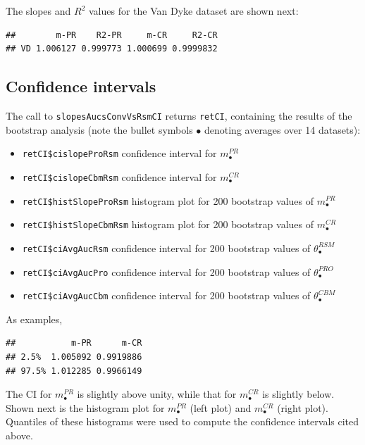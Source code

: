 \documentclass[
]{book}
\providecommand{\tightlist}{%
  \setlength{\itemsep}{0pt}\setlength{\parskip}{0pt}}
\begin{document}
The slopes and \(R^2\) values for the Van Dyke dataset are shown next:

\begin{verbatim}
##        m-PR    R2-PR     m-CR     R2-CR
## VD 1.006127 0.999773 1.000699 0.9999832
\end{verbatim}

\hypertarget{rsm-3-fits-confidence-intervals}{%
\subsection{Confidence intervals}\label{rsm-3-fits-confidence-intervals}}

The call to \texttt{slopesAucsConvVsRsmCI} returns \texttt{retCI}, containing the results of the bootstrap analysis (note the bullet symbols \(\bullet\) denoting averages over 14 datasets):

\begin{itemize}
\tightlist
\item
  \texttt{retCI\$cislopeProRsm} confidence interval for \(m^{PR}_\bullet\)
\item
  \texttt{retCI\$cislopeCbmRsm} confidence interval for \(m^{CR}_\bullet\)
\item
  \texttt{retCI\$histSlopeProRsm} histogram plot for 200 bootstrap values of \(m^{PR}_\bullet\)
\item
  \texttt{retCI\$histSlopeCbmRsm} histogram plot for 200 bootstrap values of \(m^{CR}_\bullet\)
\item
  \texttt{retCI\$ciAvgAucRsm} confidence interval for 200 bootstrap values of \(\theta^{RSM}_\bullet\)
\item
  \texttt{retCI\$ciAvgAucPro} confidence interval for 200 bootstrap values of \(\theta^{PRO}_\bullet\)
\item
  \texttt{retCI\$ciAvgAucCbm} confidence interval for 200 bootstrap values of \(\theta^{CBM}_\bullet\)
\end{itemize}

As examples,

\begin{verbatim}
##           m-PR      m-CR
## 2.5%  1.005092 0.9919886
## 97.5% 1.012285 0.9966149
\end{verbatim}

The CI for \(m^{PR}_\bullet\) is slightly above unity, while that for \(m^{CR}_\bullet\) is slightly below. Shown next is the histogram plot for \(m^{PR}_\bullet\) (left plot) and \(m^{CR}_\bullet\) (right plot). Quantiles of these histograms were used to compute the confidence intervals cited above.
\end{document}

